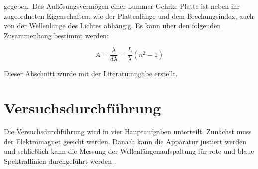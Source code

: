 gegeben. Das Auflösungsvermögen einer Lummer-Gehrke-Platte ist 
neben ihr zugeordneten Eigenschaften, wie der Plattenlänge und 
dem Brechungsindex, auch von der Wellenlänge des Lichtes 
abhängig. Es kann über den folgenden Zusammenhang bestimmt 
werden:

\begin{equation}
    A = \frac{\lambda}{\delta \lambda} = \frac{L}{\lambda}(n^2 -1)
    \label{eq:del_A}
\end{equation}

Dieser Abschnitt wurde mit der Literaturangabe \cite{sample} erstellt.

\section{Versuchsdurchführung}
\label{sec:Versuchsdurchführung}

Die Versuchsdurchführung wird in vier Hauptaufgaben unterteilt.
Zunächst muss der Elektromagnet geeicht werden. Danach kann die 
Apparatur justiert werden und schließlich kann die Messung 
der Wellenlängenaufspaltung für rote und blaue Spektrallinien 
durchgeführt werden \cite{sample}.

